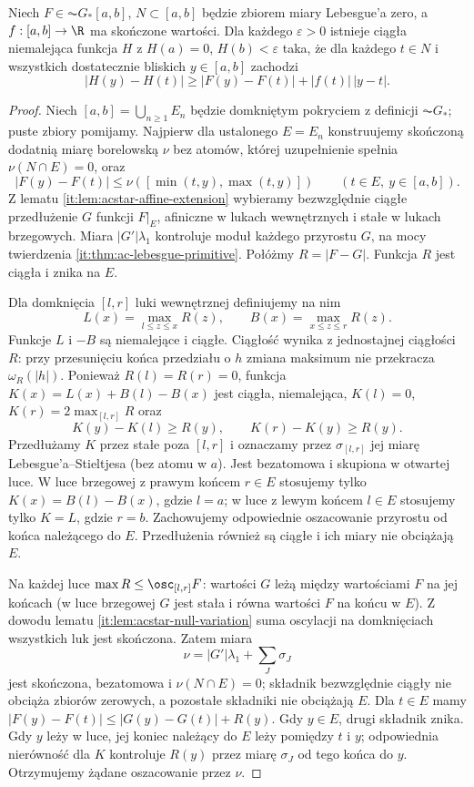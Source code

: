 \begin{lemat}\label{it:lem:perron-null-correction}
Niech $F\in\AC G_*[a,b]$, $N\subset[a,b]$ będzie zbiorem
miary Lebesgue'a zero, a $f:[a,b]\to\R$ ma skończone wartości.
Dla każdego $\varepsilon>0$ istnieje ciągła niemalejąca funkcja
$H$ z $H(a)=0$, $H(b)<\varepsilon$ taka, że dla każdego $t\in N$
i wszystkich dostatecznie bliskich $y\in[a,b]$ zachodzi
\[
 |H(y)-H(t)|\ge |F(y)-F(t)|+|f(t)|\,|y-t|.
\]
\end{lemat}
\begin{proof}
Niech $[a,b]=\bigcup_{n\ge1}E_n$ będzie domkniętym pokryciem
z definicji $\AC G_*$; puste zbiory pomijamy. Najpierw dla
ustalonego $E=E_n$ konstruujemy skończoną dodatnią miarę
borelowską $\nu$ bez atomów, której uzupełnienie spełnia $\nu(N\cap E)=0$, oraz
\[
 |F(y)-F(t)|\le\nu([\min(t,y),\max(t,y)])
 \qquad(t\in E,\ y\in[a,b]).
\]
Z lematu \ref{it:lem:acstar-affine-extension} wybieramy
bezwzględnie ciągłe przedłużenie $G$ funkcji $F|_E$, afiniczne
w lukach wewnętrznych i stałe w lukach brzegowych.
Miara $|G'|\lambda_1$ kontroluje moduł każdego przyrostu $G$,
na mocy twierdzenia \ref{it:thm:ac-lebesgue-primitive}.
Połóżmy $R=|F-G|$. Funkcja $R$ jest ciągła i znika na $E$.

Dla domknięcia $[l,r]$ luki wewnętrznej definiujemy na nim
\[
 L(x)=\max_{l\le z\le x}R(z),\qquad
 B(x)=\max_{x\le z\le r}R(z).
\]
Funkcje $L$ i $-B$ są niemalejące i ciągłe. Ciągłość wynika
z jednostajnej ciągłości $R$: przy przesunięciu końca
przedziału o $h$ zmiana maksimum nie przekracza $\omega_R(|h|)$.
Ponieważ $R(l)=R(r)=0$, funkcja
$K(x)=L(x)+B(l)-B(x)$ jest ciągła, niemalejąca, $K(l)=0$,
$K(r)=2\max_{[l,r]}R$ oraz
\[
 K(y)-K(l)\ge R(y),\qquad K(r)-K(y)\ge R(y).
\]
Przedłużamy $K$ przez stałe poza $[l,r]$ i oznaczamy przez
$\sigma_{[l,r]}$ jej miarę Lebesgue'a--Stieltjesa (bez atomu
w $a$). Jest bezatomowa i skupiona w otwartej luce.
W luce brzegowej z prawym końcem $r\in E$ stosujemy tylko
$K(x)=B(l)-B(x)$, gdzie $l=a$; w luce z lewym końcem $l\in E$
stosujemy tylko $K=L$, gdzie $r=b$. Zachowujemy odpowiednie
oszacowanie przyrostu od końca należącego do $E$.
Przedłużenia również są ciągłe i ich miary nie obciążają $E$.

Na każdej luce $\max R\le\osc_{[l,r]}F$: wartości $G$ leżą
między wartościami $F$ na jej końcach (w luce brzegowej
$G$ jest stała i równa wartości $F$ na końcu w $E$).
Z dowodu lematu \ref{it:lem:acstar-null-variation} suma
oscylacji na domknięciach wszystkich luk jest skończona.
Zatem miara
\[
 \nu=|G'|\lambda_1+\sum_J\sigma_J
\]
jest skończona, bezatomowa i $\nu(N\cap E)=0$; składnik
bezwzględnie ciągły nie obciąża zbiorów zerowych, a pozostałe
składniki nie obciążają $E$. Dla $t\in E$ mamy
$|F(y)-F(t)|\le |G(y)-G(t)|+R(y)$. Gdy $y\in E$,
drugi składnik znika. Gdy $y$ leży w luce, jej koniec
należący do $E$ leży pomiędzy $t$ i $y$; odpowiednia
nierówność dla $K$ kontroluje $R(y)$ przez miarę
$\sigma_J$ od tego końca do $y$. Otrzymujemy żądane
oszacowanie przez $\nu$.


\end{proof}

